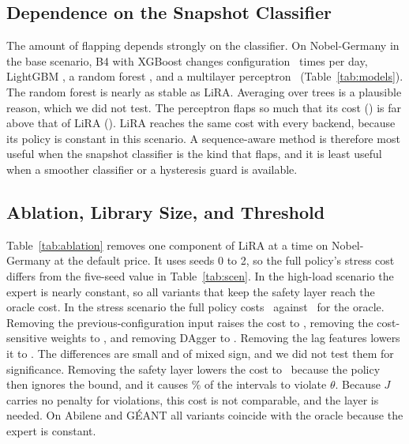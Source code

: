 \documentclass[journal]{IEEEtran}
\begin{document}
\subsection{Dependence on the Snapshot Classifier}\label{sec:res-models}

The amount of flapping depends strongly on the classifier. On Nobel-Germany in the base scenario, B4 with XGBoost changes configuration \modXgbChg\ times per day, LightGBM \modLgbmChg, a random forest \modRfChg, and a multilayer perceptron \modMlpChg\ (Table~\ref{tab:models}). The random forest is nearly as stable as LiRA. Averaging over trees is a plausible reason, which we did not test. The perceptron flaps so much that its cost (\modMlpJ) is far above that of LiRA (\nobJlira). LiRA reaches the same cost with every backend, because its policy is constant in this scenario. A sequence-aware method is therefore most useful when the snapshot classifier is the kind that flaps, and it is least useful when a smoother classifier or a hysteresis guard is available.

\begin{table}[t]
\centering
\caption{Choice of Model on Nobel-Germany (Base Scenario, Seed 0). Chg/d: Changes per Day}
\label{tab:models}
\footnotesize
\setlength{\tabcolsep}{3pt}

\end{table}

\subsection{Ablation, Library Size, and Threshold}\label{sec:res-ablation}

Table~\ref{tab:ablation} removes one component of LiRA at a time on Nobel-Germany at the default price. It uses seeds 0 to 2, so the full policy's stress cost differs from the five-seed value in Table~\ref{tab:scen}. In the high-load scenario the expert is nearly constant, so all variants that keep the safety layer reach the oracle cost. In the stress scenario the full policy costs \ablStressFull\ against \ablStressO\ for the oracle. Removing the previous-configuration input raises the cost to \ablStressNoPrev, removing the cost-sensitive weights to \ablStressNoCS, and removing DAgger to \ablStressNoDagger. Removing the lag features lowers it to \ablStressNoLag. The differences are small and of mixed sign, and we did not test them for significance. Removing the safety layer lowers the cost to \ablStressNoSafe\ because the policy then ignores the bound, and it causes \ablStressNoSafeViol\% of the intervals to violate $\theta$. Because $J$ carries no penalty for violations, this cost is not comparable, and the layer is needed. On Abilene and G\'{E}ANT all variants coincide with the oracle because the expert is constant.
\end{document}
